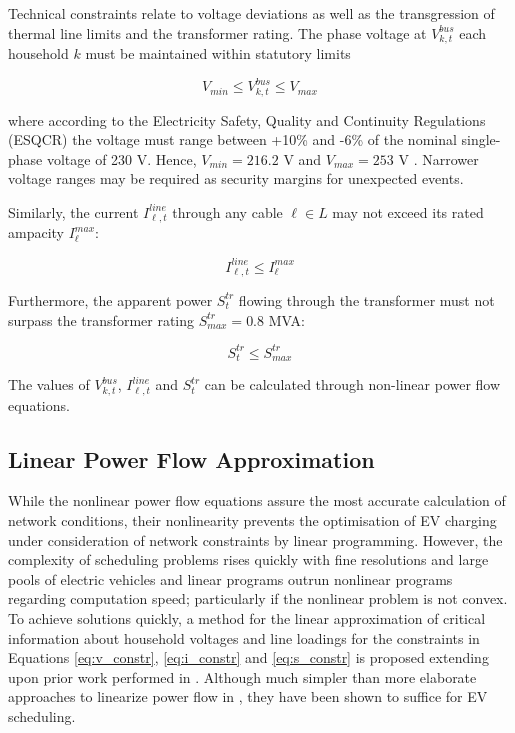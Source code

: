 
Technical constraints relate to voltage deviations as well as the transgression of thermal line limits and the transformer rating. The phase voltage at $V_{k,t}^{bus}$ each household $k$ must be maintained within statutory limits

\begin{equation}
V_{min} \leq V_{k,t}^{bus} \leq V_{max}
\label{eq:v_constr}
\end{equation}

where according to the Electricity Safety, Quality and Continuity Regulations (ESQCR) the voltage must range between +10\% and -6\% of the nominal single-phase voltage of 230 V. Hence, $V_{min}=216.2$ V and $V_{max}=253$ V \cite{DepartmentofTradeandIndustry2002}. Narrower voltage ranges may be required as security margins for unexpected events. 

Similarly, the current $I_{\ell,t}^{line}$ through any cable $\ell \in L$ may not exceed its rated ampacity $I_{\ell}^{max}$:

\begin{equation}
I_{\ell,t}^{line} \leq I_{\ell}^{max}
\label{eq:i_constr}
\end{equation}

Furthermore, the apparent power $S_t^{tr}$ flowing through the transformer must not surpass the transformer rating $S^{tr}_{max}=0.8$ MVA:

\begin{equation}
S_t^{tr} \leq S^{tr}_{max}
\label{eq:s_constr}
\end{equation}

The values of $V_{k,t}^{bus}$, $I_{\ell,t}^{line}$ and $S_t^{tr}$ can be calculated through non-linear power flow equations. 

\subsection{Linear Power Flow Approximation}
\label{sec:lpf}


While the nonlinear power flow equations assure the most accurate calculation of network conditions, their nonlinearity prevents the optimisation of EV charging under consideration of network constraints by linear programming. However, the complexity of scheduling problems rises quickly with fine resolutions and large pools of electric vehicles and linear programs outrun nonlinear programs regarding computation speed; particularly if the nonlinear problem is not convex. To achieve solutions quickly, a method for the linear approximation of critical information about household voltages and line loadings for the constraints in Equations \ref{eq:v_constr}, \ref{eq:i_constr} and \ref{eq:s_constr} is proposed extending upon prior work performed in \cite{Richardson2012, OConnell2014, Richardson2012a}. Although much simpler than more elaborate approaches to linearize power flow in \cite{Marti2013,Ahmadi2015,Ahmadi2016}, they have been shown to suffice for EV scheduling.

